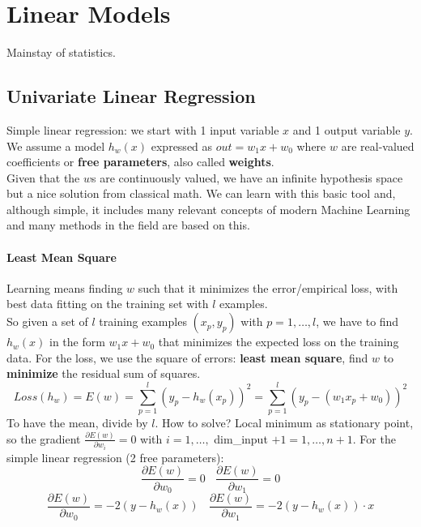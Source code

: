 \documentclass[10pt]{report}
\begin{document}
\section{Linear Models} Mainstay of statistics.
\subsection{Univariate Linear Regression} Simple linear regression: we start with 1 input variable $x$ and 1 output variable $y$. We assume a model $h_w(x)$ expressed as $out = w_1x + w_0$ where $w$ are real-valued coefficients or \textbf{free parameters}, also called \textbf{weights}.\\
Given that the $w$s are continuously valued, we have an infinite hypothesis space but a nice solution from classical math. We can learn with this basic tool and, although simple, it includes many relevant concepts of modern Machine Learning and many methods in the field are based on this.
\paragraph{Least Mean Square} Learning means finding $w$ such that it minimizes the error/empirical loss, with best data fitting on the training set with $l$ examples.\\
So given a set of $l$ training examples $(x_p, y_p)$ with $p = 1,\ldots,l$, we have to find $h_w(x)$ in the form $w_1x + w_0$ that minimizes the expected loss on the training data. For the loss, we use the square of errors: \textbf{least mean square}, find $w$ to \textbf{minimize} the residual sum of squares.
$$Loss(h_w) = E(w) = \sum_{p=1}^l (y_p - h_w(x_p))^2 = \sum_{p=1}^l (y_p - (w_1x_p + w_0))^2$$
To have the mean, divide by $l$. How to solve? Local minimum as stationary point, so the gradient $\frac{\partial E(w)}{\partial w_i} = 0$ with $i = 1,\ldots,$ dim\_input $+1 = 1,\ldots, n+1$. For the simple linear regression (2 free parameters):
$$\frac{\partial E(w)}{\partial w_0} = 0\:\:\:\:\frac{\partial E(w)}{\partial w_1} = 0$$
$$\frac{\partial E(w)}{\partial w_0} = -2(y - h_w(x))\:\:\:\:\frac{\partial E(w)}{\partial w_1} = -2(y - h_w(x))\cdot x$$
\end{document}

